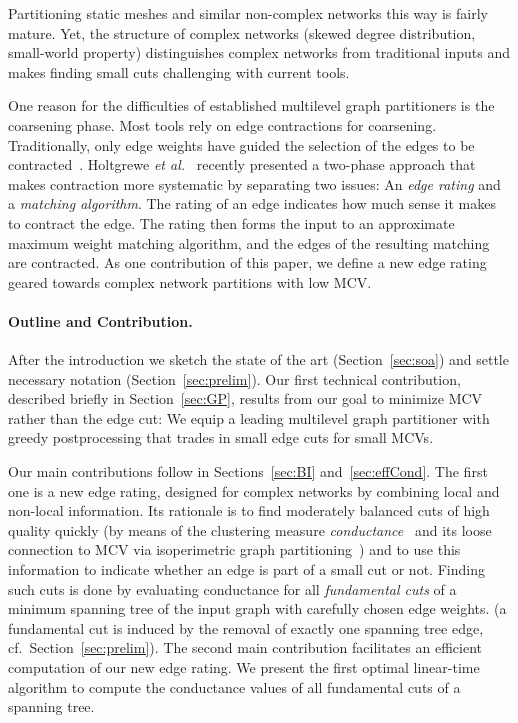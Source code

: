 \documentclass[pdftex]{llncs}
\newcommand{\etal}{\textit{et al.}\xspace}
\numberwithin{equation}{section}
\numberwithin{example}{section}
\numberwithin{table}{section}
\begin{document}
Partitioning static meshes and similar non-complex networks 
this way is fairly mature. Yet, the structure of complex networks (skewed degree
distribution, small-world property) distinguishes complex networks from traditional
inputs and makes finding small cuts challenging with current tools.

One reason for the difficulties of established multilevel graph
partitioners is the coarsening phase. Most tools rely on edge
contractions for coarsening. Traditionally, only edge weights have
guided the selection of the edges to be
contracted~\cite{karypis1998fast}. Holtgrewe
\etal~\cite{HoltgreweSS10engineering} recently presented a two-phase
approach that makes contraction more systematic by separating two
issues: An \emph{edge rating} and a \emph{matching algorithm}. The
rating of an edge indicates how much sense it makes to contract the
edge. The rating then forms the input to an approximate maximum weight
matching algorithm, and the edges of the resulting matching are
contracted.  As one contribution of this paper, we define a new edge
rating geared towards complex network partitions with low MCV.













\paragraph{Outline and Contribution.}
\label{subsec:contribution}
After the introduction we sketch the state of the art
(Section~\ref{sec:soa}) and settle necessary notation
(Section~\ref{sec:prelim}).
Our first technical contribution, described briefly in Section~\ref{sec:GP},
results from our goal to minimize MCV rather than the edge cut: We equip 
a leading multilevel graph partitioner with  greedy postprocessing that trades in small edge cuts for small MCVs.


Our main contributions follow in Sections~\ref{sec:BI} and~\ref{sec:effCond}.
The first one is a new edge rating, designed for complex networks by
combining local and non-local information. Its rationale is to find moderately
balanced cuts of high quality quickly (by means of the clustering measure
\emph{conductance}~\cite{Kannan04clustering} and its loose connection to MCV via isoperimetric graph partitioning~\cite{GradyS06isoperimetric}) and to use this information to indicate whether
an edge is part of a small cut or not. Finding such cuts is done by evaluating 
conductance for all \emph{fundamental cuts} of a 
minimum spanning tree of the input graph with carefully chosen edge weights. 
(a fundamental cut is induced by the removal of exactly one 
spanning tree edge, cf.\ Section~\ref{sec:prelim}).
The second main contribution facilitates an efficient computation of our new
edge rating. We present the first optimal linear-time algorithm to
compute the conductance values of all fundamental cuts of a spanning
tree. 
\end{document}
